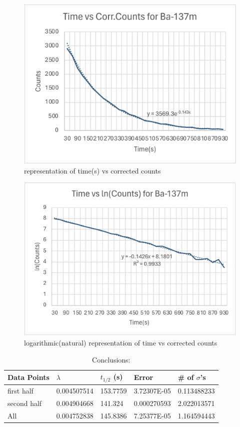 \documentclass[twocolumn]{article}
\begin{document}
\begin{center}
\begin{figure}[h!]
\centering
\includegraphics[scale=0.065]{lab13_c.png}
\caption{\small{ representation of time(s) vs corrected counts }}
\end{figure}
\begin{figure}[h!]
\centering
\includegraphics[scale=0.06]{lab13_d.png}
\caption{\small{logarithmic(natural) representation of time vs corrected counts }}
\end{figure}
\end{center}


\begin{table}[h!]
\small
\caption{Conclusions:}
\begin{tabular}{|l|l|l|l|l|}
\hline
Data Points & $\lambda$ & $t_{1/2}$ (s) & Error & \# of $\sigma$'s \\
\hline
first half & 0.004507514 & 153.7759 & 3.72307E-05 & 0.113488233 \\
\hline
second half & 0.004904668 & 141.324 & 0.000270593 & 2.022013571 \\
\hline
All & 0.004752838 & 145.8386 & 7.25377E-05 & 1.164594443 \\ 
\hline
\end{tabular}
\end{table}
\end{document}
